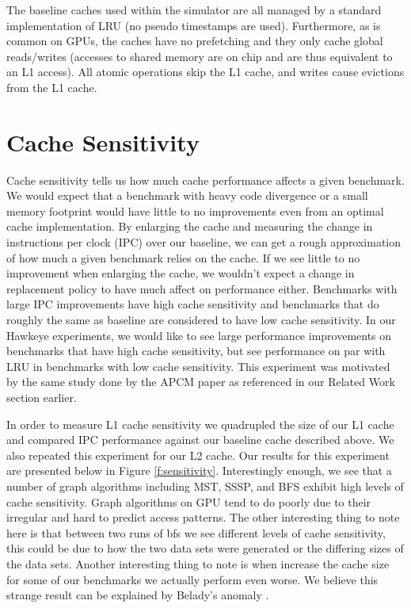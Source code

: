 The baseline caches used within the simulator are all managed by a standard implementation of LRU (no pseudo timestamps are used). Furthermore, as is common on GPUs, the caches have no prefetching and they only cache global reads/writes (accesses to shared memory are on chip and are thus equivalent to an L1 access). All atomic operations skip the L1 cache, and writes cause evictions from the L1 cache.

\section{Cache Sensitivity}
Cache sensitivity tells us how much cache performance affects a given benchmark. We would expect that a benchmark with heavy code divergence or a small memory footprint would have little to no improvements even from an optimal cache implementation. By enlarging the cache and measuring the change in instructions per clock (IPC) over our baseline, we can get a rough approximation of how much a given benchmark relies on the cache. If we see little to no improvement when enlarging the cache, we wouldn't expect a change in replacement policy to have much affect on performance either. Benchmarks with large IPC improvements have high cache sensitivity and benchmarks that do roughly the same as baseline are considered to have low cache sensitivity. In our Hawkeye experiments, we would like to see large performance improvements on benchmarks that have high cache sensitivity, but see performance on par with LRU in benchmarks with low cache sensitivity. This experiment was motivated by the same study done by the APCM paper as referenced in our Related Work section earlier.

In order to measure L1 cache sensitivity we quadrupled the size of our L1 cache and compared IPC performance against our baseline cache described above. We also repeated this experiment for our L2 cache. Our results for this experiment are presented below in Figure \ref{f:sensitivity}. Interestingly enough, we see that a number of graph algorithms including MST, SSSP, and BFS exhibit high levels of cache sensitivity. Graph algorithms on GPU tend to do poorly due to their irregular and hard to predict access patterns. The other interesting thing to note here is that between two runs of bfs we see different levels of cache sensitivity, this could be due to how the two data sets were generated or the differing sizes of the data sets. Another interesting thing to note is when increase the cache size for some of our benchmarks we actually perform even worse. We believe this strange result can be explained by Belady’s anomaly \cite{belady_anomaly}.

